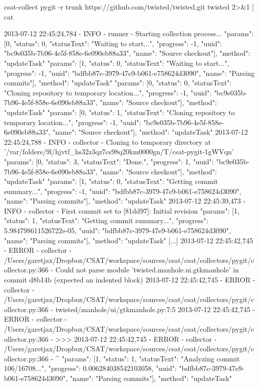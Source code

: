 \begin{userprompt}[basicstyle=\scriptsize\bf\ttfamily,caption={Example output of the \texttt{pygit} collector when run without a TTY},label=lst:pygit-out]
csat-collect pygit -r trunk https://github.com/twisted/twisted.git twisted 2>&1 | cat
\end{userprompt}
\begin{cmdresult}[basicstyle=\tiny\ttfamily]
2013-07-12 22:45:24,784 - INFO - runner - Starting collection process...
{"params": [0, {"status": 0, "statusText": "Waiting to start...", "progress": -1, "uuid": "bc9e035b-7b96-4e5f-858e-6e090eb88a33", "name": "Source checkout"}], "method": "updateTask"}
{"params": [1, {"status": 0, "statusText": "Waiting to start...", "progress": -1, "uuid": "bdfbb87c-3979-47e9-b061-e758624d3090", "name": "Parsing commits"}], "method": "updateTask"}
{"params": [0, {"status": 0, "statusText": "Cloning repository to temporary location...", "progress": -1, "uuid": "bc9e035b-7b96-4e5f-858e-6e090eb88a33", "name": "Source checkout"}], "method": "updateTask"}
{"params": [0, {"status": 1, "statusText": "Cloning repository to temporary location...", "progress": -1, "uuid": "bc9e035b-7b96-4e5f-858e-6e090eb88a33", "name": "Source checkout"}], "method": "updateTask"}
2013-07-12 22:45:24,788 - INFO - collector - Cloning to temporary directory at '/var/folders/9l/hjvtf_hs32z3qz7cs98q20km0000gn/T/csat-pygit-1gWVqn'
{"params": [0, {"status": 3, "statusText": "Done.", "progress": 1, "uuid": "bc9e035b-7b96-4e5f-858e-6e090eb88a33", "name": "Source checkout"}], "method": "updateTask"}
{"params": [1, {"status": 0, "statusText": "Getting commit summary...", "progress": -1, "uuid": "bdfbb87c-3979-47e9-b061-e758624d3090", "name": "Parsing commits"}], "method": "updateTask"}
2013-07-12 22:45:39,473 - INFO - collector - First commit set to [81dd97]: Initial revision
{"params": [1, {"status": 1, "statusText": "Getting commit summary...", "progress": 5.984798611526722e-05, "uuid": "bdfbb87c-3979-47e9-b061-e758624d3090", "name": "Parsing commits"}], "method": "updateTask"}
[...]
2013-07-12 22:45:42,745 - ERROR - collector - /Users/garetjax/Dropbox/CSAT/workspace/sources/csat/csat/collectors/pygit/collector.py:366 - Could not parse module 'twisted.manhole.ui.gtkmanhole' in commit d8b14b (expected an indented block)
2013-07-12 22:45:42,745 - ERROR - collector - /Users/garetjax/Dropbox/CSAT/workspace/sources/csat/csat/collectors/pygit/collector.py:366 - twisted/manhole/ui/gtkmanhole.py:7:5
2013-07-12 22:45:42,745 - ERROR - collector - /Users/garetjax/Dropbox/CSAT/workspace/sources/csat/csat/collectors/pygit/collector.py:366 - >>>
2013-07-12 22:45:42,745 - ERROR - collector - /Users/garetjax/Dropbox/CSAT/workspace/sources/csat/csat/collectors/pygit/collector.py:366 -         ^
{"params": [1, {"status": 1, "statusText": "Analyzing commit 106/16708...", "progress": 0.006284038542103058, "uuid": "bdfbb87c-3979-47e9-b061-e758624d3090", "name": "Parsing commits"}], "method": "updateTask"}
\end{cmdresult}


